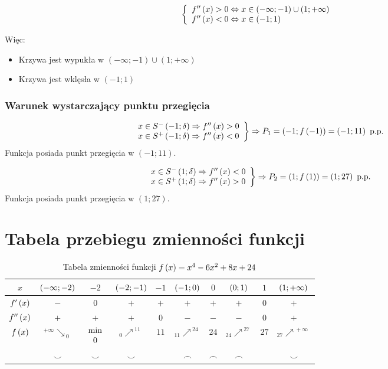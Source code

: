 \documentclass[a4paper,12pt]{article}
\newcommand{\fodx}{
		\ensuremath f \left( x \right)
	}
\newcommand{\podx}{
		\ensuremath f' \left( x \right)
	}
\newcommand{\dodx}{
		\ensuremath f'' \left( x \right)
	}
\newcommand{\naw}[1]{
		\ensuremath \left( #1 \right)
	}
\newcommand{\dnj}[2]{
	\ensuremath  \begin{array}{c}
		#1\\
		#2
	\end{array} 
}
\begin{document}
\[\left\{
	\begin{array}{l}
		\dodx > 0 \Leftrightarrow x \in \left( -\infty; -1 \right) \cup \left( 1; +\infty \right)\\
		\dodx < 0 \Leftrightarrow x \in \left( -1; 1 \right)
	\end{array}
\right.
\]

Więc:
\begin{itemize}
	\item Krzywa jest wypukła w $\left( -\infty; -1 \right) \cup \left( 1; +\infty \right)$
	\item Krzywa jest wklęsła w $\left( -1; 1 \right)$

\end{itemize}

\subsubsection*{Warunek wystarczający punktu przegięcia}

\[ \left.
		\begin{array}{l}
			x \in S^- \left(-1; \delta \right) \Rightarrow \dodx > 0 \\
			x \in S^+ \left(-1; \delta \right) \Rightarrow \dodx < 0
		\end{array}
	\right\} \Rightarrow P_1 = \left(-1; f \left(-1 \right) \right) = \left( -1; 11 \right) \text{ p.p.}
\]
Funkcja posiada punkt przegięcia w $\left( -1; 11 \right)$.

\[ \left.
		\begin{array}{l}
			x \in S^- \left(1; \delta \right) \Rightarrow \dodx < 0 \\
			x \in S^+ \left(1; \delta \right) \Rightarrow \dodx > 0
		\end{array}
	\right\} \Rightarrow P_2 = \left(1; f \left(1 \right) \right) = \left( 1; 27 \right) \text{ p.p.}
\]
Funkcja posiada punkt przegięcia w $\left( 1; 27 \right)$.

\section{Tabela przebiegu zmienności funkcji}

\begin{table}[h]
	\centering
	\begin{tabular}{c|c|c|c|c|c|c|c|c|c|}
		$x$	& $\naw{ -\infty; -2}$	& $-2$	& $\naw{ -2; -1}$	& $-1$	& $\naw{-1; 0}$	& $0$	& $\naw{0;1}$	& $1$	& $\naw{1; +\infty}$	\\ \hline 
		$\podx$	& $-$			& $0$	& $+$			& $+$	& $+$		& $+$	& $+$		& $0$	& $+$			\\ \hline
		$\dodx$	& $+$			& $+$	& $+$			& $0$	& $-$		& $-$	& $-$		& $0$	& $+$			\\ \hline
		$\fodx$	& $^{+\infty} \searrow_{\:0}$	& $\dnj{\min}{0}$	& $_0 \nearrow^{\: 11}$	& $11$	& $_{11}\nearrow^{\: 24}$	& $24$	& $_{24}\nearrow^{\: 27}$	& $27$	& $_{27}\nearrow^{\: + \infty}$ \\
			& $\smile$		& $\smile$	& $\smile$	& 	& $\frown$	& $\frown$	& $\frown$ 	&	& $\smile$
	\end{tabular}
	\caption{Tabela zmienności funkcji $\fodx = x^4 - 6x^2 + 8x + 24$}
	\label{tab:tabelken}
\end{table}
\end{document}
